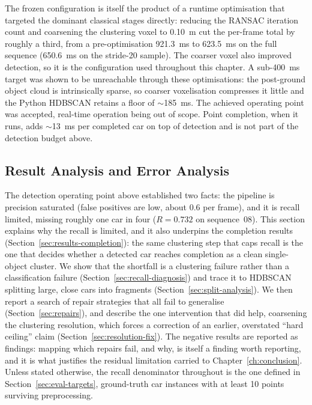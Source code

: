 The frozen configuration is itself the product of a runtime optimisation that
targeted the dominant classical stages directly: reducing the
RANSAC iteration count and coarsening the clustering voxel to \SI{0.10}{\metre}
cut the per-frame total by roughly a third, from a pre-optimisation
\SI{921.3}{\milli\second} to \SI{623.5}{\milli\second} on the full sequence
(\SI{650.6}{\milli\second} on the stride-20 sample). The coarser voxel also
improved detection, so it is the configuration used throughout
this chapter. A sub-\SI{400}{\milli\second} target was shown to be unreachable
through these optimisations: the post-ground object cloud is
intrinsically sparse, so coarser voxelisation compresses it little and the Python
HDBSCAN retains a floor of $\sim$\SI{185}{\milli\second}. The achieved
operating point was accepted, real-time operation being out of scope. Point completion, when it runs, adds
$\sim$\SI{13}{\milli\second} per completed car on top of detection and is not part
of the detection budget above.

\subsection{Result Analysis and Error Analysis}
\label{sec:recall-analysis}

The detection operating point above established two facts: the pipeline is
precision saturated (false positives are low, about \num{0.6} per frame),
and it is recall limited, missing roughly one car in four
($R=\num{0.732}$ on sequence~08). This section explains why the recall is
limited, and it also underpins the completion results
(Section~\ref{sec:results-completion}): the same clustering step that caps recall
is the one that decides whether a detected car reaches completion as a clean
single-object cluster. We show that the shortfall is
a clustering failure rather than a classification failure
(Section~\ref{sec:recall-diagnosis}) and trace it to HDBSCAN splitting large,
close cars into fragments (Section~\ref{sec:split-analysis}). We then report a search of
repair strategies that all fail to generalise (Section~\ref{sec:repairs}), and
describe the one intervention that did help, coarsening the clustering
resolution, which forces a correction of an earlier, overstated ``hard
ceiling'' claim (Section~\ref{sec:resolution-fix}). The negative results are
reported as findings: mapping which repairs fail, and why, is
itself a finding worth reporting, and it is what justifies the residual limitation carried to
Chapter~\ref{ch:conclusion}. Unless stated otherwise, the recall denominator
throughout is the one defined in Section~\ref{sec:eval-targets}, ground-truth
car instances with at least \num{10} points surviving preprocessing.

